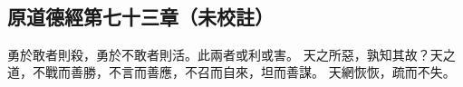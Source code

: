 ﻿%
%

\chapter{~}

\section{原道德經第七十三章（未校註）}

\begin{withgezhu}

\zhsong


勇於敢者則殺，勇於不敢者則活。此兩者或利或害。
天之所惡，孰知其故？天之道，不戰而善勝，不言而善應，不召而自來，坦而善謀。
天網恢恢，疏而不失。

\end{withgezhu}
